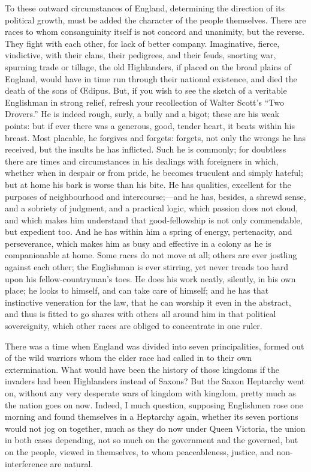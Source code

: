 To these outward circumstances of England,
determining the direction of its political growth, must be added the
character of the people themselves. There are races to whom
consanguinity itself is not concord and unanimity, but the reverse.
They fight with each other, for lack of better company. Imaginative,
fierce, vindictive, with their clans, their pedigrees, and their
feuds, snorting war, spurning trade or tillage, the old Highlanders,
if placed on the broad plains of England, would have in time run
through their national existence, and died the death of the sons of Œdipus.
But, if you wish to see the sketch of a veritable Englishman in strong
relief, refresh your recollection of Walter Scott's ``Two Drovers.'' He
is indeed rough, surly, a bully and a bigot; these are his weak
points: but if ever there was a generous, good, tender heart, it beats
within his breast. Most placable, he forgives and forgets: forgets,
not only the wrongs he has received, but the insults he has inflicted.
Such he is commonly; for doubtless there are times and circumstances
in his dealings with foreigners in which, whether when in despair or
from pride, he becomes truculent and simply hateful; but at home his
bark is worse than his bite. He has qualities, excellent for the
purposes of neighbourhood and intercourse;—and he has, besides, a
shrewd sense, and a sobriety of judgment, and a practical logic, which
passion does not cloud, and which makes him understand that
good-fellowship is not only commendable, but expedient too. And he has
within him a spring of energy, pertenacity, and perseverance, which
makes him as busy and effective in a colony as he is companionable at
home. Some races do not move at all; others are ever jostling against each other; the Englishman is ever stirring, yet never treads
too hard upon his fellow-countryman's toes. He does his work neatly,
silently, in his own place; he looks to himself, and can take care of
himself; and he has that instinctive veneration for the law, that he
can worship it even in the abstract, and thus is fitted to go shares
with others all around him in that political sovereignity, which other
races are obliged to concentrate in one ruler.

There was a time when England was divided into
seven principalities, formed out of the wild warriors whom the elder
race had called in to their own extermination. What would have been
the history of those kingdoms if the invaders had been Highlanders
instead of Saxons? But the Saxon Heptarchy went on, without any very
desperate wars of kingdom with kingdom, pretty much as the nation goes
on now. Indeed, I much question, supposing Englishmen rose one morning
and found themselves in a Heptarchy again, whether its seven portions
would not jog on together, much as they do now under Queen Victoria,
the union in both cases depending, not so much on the government and
the governed, but on the people, viewed in themselves, to whom
peaceableness, justice, and non-interference are natural.

